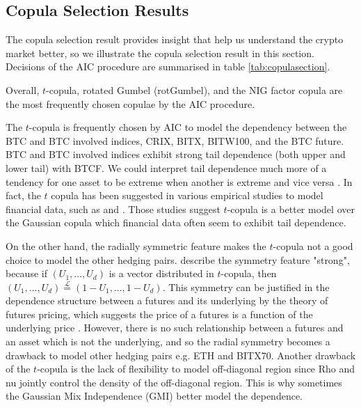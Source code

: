 \subsection{Copula Selection Results}\label{sec: copula results}
The copula selection result provides insight that help us understand the crypto market better, so
we illustrate the copula selection result in this section. 
Decisions of the AIC procedure are summarised in table \ref{tab:copulasection}. \medskip

Overall, $t$-copula, rotated Gumbel (rotGumbel), and the NIG factor copula are the most frequently chosen copulae by the AIC procedure. \medskip

The $t$-copula is frequently chosen by AIC to model the dependency between the BTC and BTC involved indices, CRIX, BITX, BITW100, and the BTC future.
BTC and BTC involved indices exhibit strong tail dependence (both upper and lower tail) with BTCF.
We could interpret tail dependence much more of a tendency for one asset to be extreme when another is extreme and vice versa \citep{McNeil2015}.
In fact, the $t$ copula has been suggested in various empirical studies to model financial data, such as \cite{zeevi2002beyond} and \cite{breymann2003dependence}.
Those studies suggest $t$-copula is a better model over the Gaussian copula which financial data often seem to exhibit tail dependence. \medskip

On the other hand, the radially symmetric feature makes the $t$-copula not a good choice to model the other hedging pairs.
\cite{demarta2005t} describe the symmetry feature "strong", because if $(U_1, ..., U_d)$ is a vector distributed in $t$-copula,
then $(U_1, ..., U_d) \overset{\mathcal{L}}= (1-U_1, ..., 1-U_d)$.
This symmetry can be justified in the dependence structure between a futures and its underlying by the theory of futures pricing,
which suggests the price of a futures is a function of the underlying price \citep{hull2003options}.
However, there is no such relationship between a futures and an asset which is not the underlying, and so the radial symmetry becomes a drawback to model other hedging pairs e.g. ETH and BITX70.
Another drawback of the $t$-copula is the lack of flexibility to model off-diagonal region since Rho and nu jointly control the density of the off-diagonal region.
This is why sometimes the Gaussian Mix Independence (GMI) better model the dependence.  \medskip

